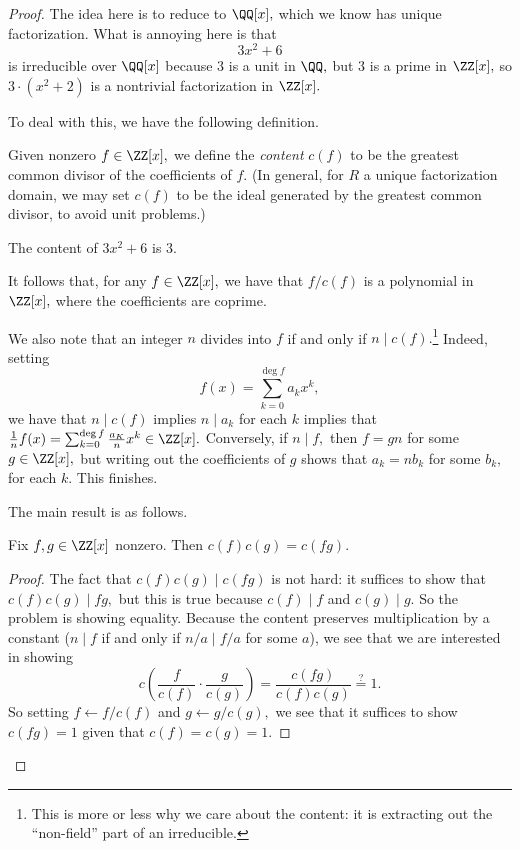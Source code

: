 \begin{proof}
	The idea here is to reduce to $\QQ[x],$ which we know has unique factorization. What is annoying here is that
	\[3x^2+6\]
	is irreducible over $\QQ[x]$ because $3$ is a unit in $\QQ,$ but $3$ is a prime in $\ZZ[x],$ so $3\cdot\left(x^2+2\right)$ is a nontrivial factorization in $\ZZ[x].$

	To deal with this, we have the following definition.
	\begin{definition}[Content]
		Given nonzero $f\in\ZZ[x],$ we define the \textit{content} $c(f)$ to be the greatest common divisor of the coefficients of $f.$ (In general, for $R$ a unique factorization domain, we may set $c(f)$ to be the ideal generated by the greatest common divisor, to avoid unit problems.)
	\end{definition}
	\begin{example}
		The content of $3x^2+6$ is $3.$
	\end{example}
	It follows that, for any $f\in\ZZ[x],$ we have that $f/c(f)$ is a polynomial in $\ZZ[x],$ where the coefficients are coprime.

	We also note that an integer $n$ divides into $f$ if and only if $n\mid c(f).$\footnote{This is more or less why we care about the content: it is extracting out the ``non-field'' part of an irreducible.} Indeed, setting
	\[f(x)=\sum_{k=0}^{\deg f}a_kx^k,\]
	we have that $n\mid c(f)$ implies $n\mid a_k$ for each $k$ implies that $\frac1nf(x)=\sum_{k=0}^{\deg f}\frac{a_K}nx^k\in\ZZ[x].$ Conversely, if $n\mid f,$ then $f=gn$ for some $g\in\ZZ[x],$ but writing out the coefficients of $g$ shows that $a_k=nb_k$ for some $b_k,$ for each $k.$ This finishes.

	The main result is as follows.
	\begin{lemma}[Gauss's] \label{lem:gauss}
		Fix $f,g\in\ZZ[x]$ nonzero. Then $c(f)c(g)=c(fg).$
	\end{lemma}
	\begin{proof}
		The fact that $c(f)c(g)\mid c(fg)$ is not hard: it suffices to show that $c(f)c(g)\mid fg,$ but this is true because $c(f)\mid f$ and $c(g)\mid g.$ So the problem is showing equality. Because the content preserves multiplication by a constant ($n\mid f$ if and only if $n/a\mid f/a$ for some $a$), we see that we are interested in showing
		\[c\left(\frac f{c(f)}\cdot\frac g{c(g)}\right)=\frac{c(fg)}{c(f)c(g)}\stackrel?=1.\]
		So setting $f\leftarrow f/c(f)$ and $g\leftarrow g/c(g),$ we see that it suffices to show $c(fg)=1$ given that $c(f)=c(g)=1.$


\end{proof}
\end{proof}
